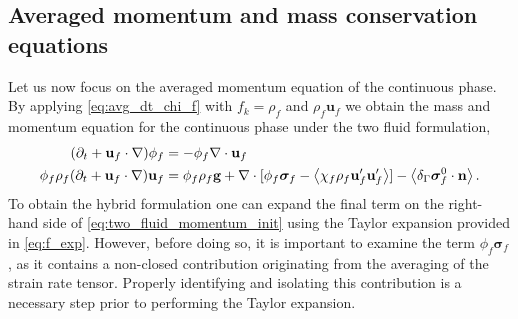 







\subsection{Averaged momentum and mass conservation equations}



Let us now focus on the averaged momentum equation of the continuous phase. 
By applying \ref{eq:avg_dt_chi_f} with $f_k = \rho_f$ and $\rho_f\textbf{u}_f$ we obtain the mass and momentum equation for the continuous phase under the two fluid formulation, 
\begin{align}
    (\pddt + \textbf{u}_f\cdot \grad)\phi_f&=-\phi_f \div \textbf{u}_f
    \label{eq:mass_init}\\
    \phi_f \rho_f(\pddt + \textbf{u}_f  \cdot \grad) \textbf{u}_f
    &= 
    \phi_f \rho_f \textbf{g}
    + \div [\phi_f \bm\sigma_f-  \avg{\chi_f\rho_f \textbf{u}_f'\textbf{u}_f'}]
    - \avg{\delta_\Gamma \bm\sigma_f^0\cdot \textbf{n}}.
    \label{eq:two_fluid_momentum_init}
\end{align} 
To obtain the hybrid formulation one can expand the final term on the right-hand side of \ref{eq:two_fluid_momentum_init} using the Taylor expansion provided in \ref{eq:f_exp}.  
However, before doing so, it is important to examine the term \( \phi_f \bm\sigma_f \), as it contains a non-closed contribution originating from the averaging of the strain rate tensor. %
Properly identifying and isolating this contribution is a necessary step prior to performing the Taylor expansion.


